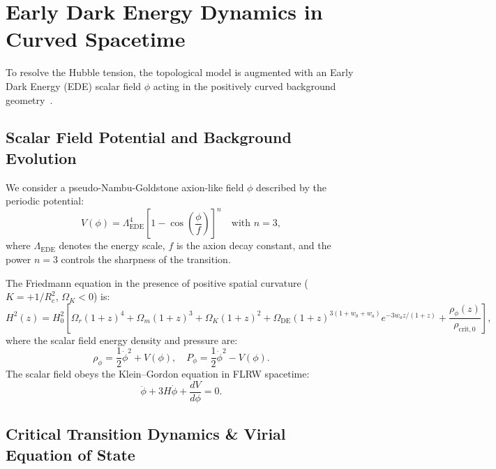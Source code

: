 \documentclass[11pt,a4paper]{article}
\theoremstyle{definition}
\newcommand{\EDE}{\mathrm{EDE}}
\begin{document}
\section{Early Dark Energy Dynamics in Curved Spacetime}

To resolve the Hubble tension, the topological model is augmented with an Early Dark Energy (EDE) scalar field $\phi$ acting in the positively curved background geometry~\cite{Poulin2019,Poulin2021,Smith2020,Hill2020,Hill2022,Kamionkowski2023}.

\subsection{Scalar Field Potential and Background Evolution}

We consider a pseudo-Nambu-Goldstone axion-like field $\phi$ described by the periodic potential:
\begin{equation}
V(\phi) = \Lambda_{\EDE}^4 \left[ 1 - \cos\left(\frac{\phi}{f}\right) \right]^n \quad \text{with } n = 3,
\end{equation}
where $\Lambda_{\EDE}$ denotes the energy scale, $f$ is the axion decay constant, and the power $n = 3$ controls the sharpness of the transition.

The Friedmann equation in the presence of positive spatial curvature ($K = +1/R_c^2$, $\Omega_K < 0$) is:
\begin{equation}
H^2(z) = H_0^2 \left[ \Omega_r (1+z)^4 + \Omega_m (1+z)^3 + \Omega_K (1+z)^2 + \Omega_{\mathrm{DE}} (1+z)^{3(1+w_0+w_a)} e^{-3 w_a z / (1+z)} + \frac{\rho_\phi(z)}{\rho_{\mathrm{crit}, 0}} \right],
\end{equation}
where the scalar field energy density and pressure are:
\begin{equation}
\rho_\phi = \frac{1}{2}\dot{\phi}^2 + V(\phi), \quad P_\phi = \frac{1}{2}\dot{\phi}^2 - V(\phi).
\end{equation}
The scalar field obeys the Klein--Gordon equation in FLRW spacetime:
\begin{equation}
\ddot{\phi} + 3 H \dot{\phi} + \frac{dV}{d\phi} = 0.
\end{equation}

\subsection{Critical Transition Dynamics \& Virial Equation of State}
\end{document}
